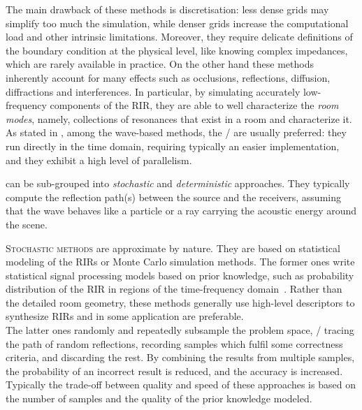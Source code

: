 \mynewline
The main drawback of these methods is discretisation:
less dense grids may simplify too much the simulation, while denser grids increase the computational load and other intrinsic limitations.
Moreover, they require delicate definitions of the boundary condition at the physical level,
like knowing complex impedances, which are rarely available in practice.
On the other hand these methods inherently account for many effects such as occlusions, reflections, diffusion, diffractions and interferences.
In particular, by simulating accurately low-frequency components of the \ac{RIR}, they are able to well characterize the \textit{room modes}, namely, collections of resonances that exist in a room and characterize it.
\\As stated in , among the wave-based methods, the \DWMs/ are usually preferred:
they run directly in the time domain, requiring typically an easier implementation, and they exhibit a high level of parallelism.

 can be sub-grouped into \textit{stochastic} and \textit{deterministic} approaches.
They typically compute the reflection path(s) between the source and the receivers,
assuming that the wave behaves like a particle or a ray carrying the acoustic energy around the scene.

\mynewline
\textsc{Stochastic methods} are approximate by nature.
They are based on statistical modeling of the \acp{RIR} or Monte Carlo simulation methods.
The former ones write statistical signal processing models based on prior knowledge,
such as probability distribution of the \ac{RIR} in regions of the time-frequency domain~.
Rather than the detailed room geometry, these methods generally use high-level descriptors
to synthesize \acp{RIR} and in some application are preferable.
\\The latter ones randomly and repeatedly subsample the problem space, \eg/ tracing the path of random reflections,
recording samples which fulfil some correctness criteria, and discarding the rest.
By combining the results from multiple samples, the probability of an incorrect result is reduced, and the accuracy is increased.
Typically the trade-off between quality and speed of these approaches is based on the number of samples and
the quality of the prior knowledge modeled.

